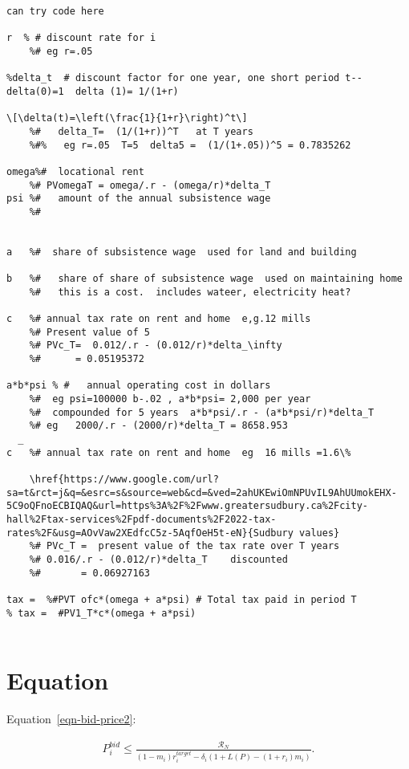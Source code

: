\begin{verbatim}
can try code here

r  % # discount rate for i
    %# eg r=.05

%delta_t  # discount factor for one year, one short period t-- delta(0)=1  delta (1)= 1/(1+r) 

\[\delta(t)=\left(\frac{1}{1+r}\right)^t\]
    %#   delta_T=  (1/(1+r))^T   at T years
    %#%   eg r=.05  T=5  delta5 =  (1/(1+.05))^5 = 0.7835262

omega%#  locational rent
    %# PVomegaT = omega/.r - (omega/r)*delta_T
psi %#   amount of the annual subsistence wage
    %#


a   %#  share of subsistence wage  used for land and building

b   %#   share of share of subsistence wage  used on maintaining home
    %#   this is a cost.  includes wateer, electricity heat?
  
c   %# annual tax rate on rent and home  e,g.12 mills
    %# Present value of 5
    %# PVc_T=  0.012/.r - (0.012/r)*delta_\infty
    %#      = 0.05195372

a*b*psi % #   annual operating cost in dollars  
    %#  eg psi=100000 b-.02 , a*b*psi= 2,000 per year 
    %#  compounded for 5 years  a*b*psi/.r - (a*b*psi/r)*delta_T
    %# eg   2000/.r - (2000/r)*delta_T = 8658.953
  _
c   %# annual tax rate on rent and home  eg  16 mills =1.6\%
    
    \href{https://www.google.com/url?sa=t&rct=j&q=&esrc=s&source=web&cd=&ved=2ahUKEwiOmNPUvIL9AhUUmokEHX-5C9oQFnoECBIQAQ&url=https%3A%2F%2Fwww.greatersudbury.ca%2Fcity-hall%2Ftax-services%2Fpdf-documents%2F2022-tax-rates%2F&usg=AOvVaw2XEdfcC5z-5AqfOeH5t-eN}{Sudbury values}
    %# PVc_T =  present value of the tax rate over T years
    %# 0.016/.r - (0.012/r)*delta_T    discounted
    %#       = 0.06927163

tax =  %#PVT ofc*(omega + a*psi) # Total tax paid in period T
% tax =  #PV1_T*c*(omega + a*psi)


\end{verbatim}

\section{Equation}
Equation~\ref{eqn-bid-price2}:


\begin{align}
P_i^{bid} \le   \frac{\mathcal{R}_N}{(1-m_i)r_i^{target}- \delta_i \left(1+L(P)- (1+ r_i)m_i\right)}.
\end{align}

